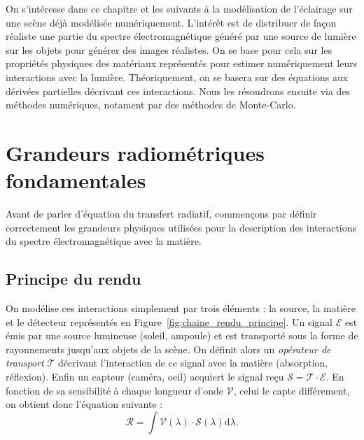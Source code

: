 \minitoc 

On s'intéresse dans ce chapitre et les suivants à la modélisation de l'éclairage sur une scène déjà modélisée numériquement. 
L'intérêt est de distribuer de façon réaliste une partie du spectre électromagnétique généré par une source de lumière sur les objets pour générer des images réalistes. 
On se base pour cela sur les propriétés physiques des matériaux représentés pour estimer numériquement leurs interactions avec la lumière. Théoriquement, on se basera sur des équations aux dérivées partielles décrivant ces interactions. Nous les résoudrons ensuite via des méthodes numériques, notament par des méthodes de Monte-Carlo. 


\section{Grandeurs radiométriques fondamentales}

Avant de parler d'équation du transfert radiatif, commençons par définir correctement les grandeurs physiques utilisées pour la description des interactions du spectre électromagnétique avec la matière. 

\subsection{Principe du rendu}

On modélise ces interactions simplement par trois éléments : la source, la matière et le détecteur représentés en Figure~\ref{fig:chaine_rendu_principe}. 
Un signal $ \mathcal{E}$ est émis par une source lumineuse (soleil, ampoule) et est transporté sous la forme de rayonnements jusqu'aux objets de la scène. On définit alors un \emph{opérateur de transport} $ \mathcal{T}$ décrivant l'interaction de ce signal avec la matière (absorption, réflexion). Enfin un capteur (caméra, oeil) acquiert le signal reçu $ \mathcal{S} = \mathcal{T} \cdot \mathcal{E}$. En fonction de sa sensibilité à chaque longueur d'onde $ \mathcal{V}$, celui le capte différement, on obtient donc l'équation suivante : 
\begin{equation}
    \mathcal{R} = \int \mathcal{V}( \lambda) \cdot \mathcal{S}( \lambda) \mathrm{d} \lambda. 
\end{equation}



